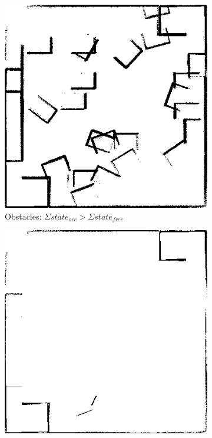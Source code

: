 \begin{figure}[htbp]
	\label{fig:amcl_classifier}
	\begin{subfigure}{.5\textwidth}
		\centering
		\includegraphics[width=1\linewidth]{chapters/cost_interpretation/figures/occ_above_0_classifier.png}
		\caption{Obstacles: \(\Sigma state_{occ} > \Sigma state_{free}\)}
		\label{fig:amcl_classifier:worst}
	\end{subfigure}
	\qquad
	\begin{subfigure}{.5\textwidth}
		\centering
		\includegraphics[width=1\linewidth]{chapters/cost_interpretation/figures/chosen_classifier.png}

\end{subfigure}
\end{figure}
